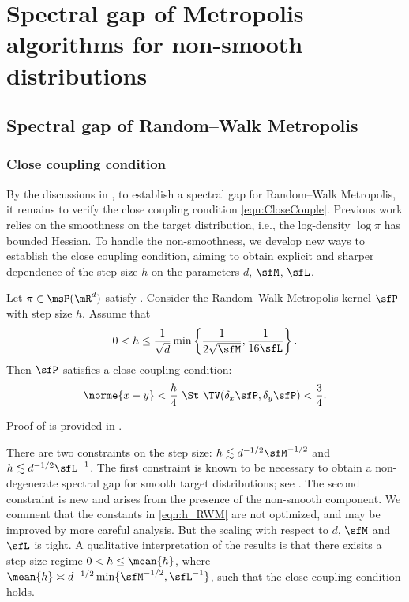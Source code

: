 \documentclass[11pt]{article}
\begin{document}
\section{Spectral gap of Metropolis algorithms for non-smooth distributions}
\label{sec:SpecGapMH}

\subsection{Spectral gap of Random--Walk Metropolis}
\label{sec:SpecGapRWM}

\subsubsection{Close coupling condition}
\label{sec:CloseCoupleRWM}

By the discussions in , to establish a spectral gap for Random--Walk Metropolis, it remains to verify the close coupling condition \eqref{eqn:CloseCouple}.
%
Previous work \citep{24-AAP2058} relies on the smoothness on the target distribution, i.e., the log-density $\log \pi$ has bounded Hessian.
%
To handle the non-smoothness, we develop new ways to establish the close coupling condition, aiming to obtain explicit and sharper dependence of the step size $h$ on the parameters $d$, $\sfM$, $\sfL$.


\begin{lem}
\label{lem:CloseCoupleRWM}
Let $\pi \in \msP(\mR^d)$ satisfy .
Consider the Random--Walk Metropolis kernel $\sfP$ with step size $h$.
Assume that
\begin{equation}
\label{eqn:h_RWM}
    0 < h \le \frac{1}{\sqrt{d}}
    \min\left\{
        \frac{1}{2\sqrt{\sfM}},
        \frac{1}{16\sfL}
    \right\}.
\end{equation}
Then $\sfP$ satisfies a close coupling condition:
\begin{equation}
\label{eqn:CloseCoupleRWM}
    \norme{x-y} < \frac{h}{4} ~\St~ \TV(\delta_x \sfP,\delta_y \sfP) < \frac{3}{4}.
\end{equation}
\end{lem}

Proof of  is provided in .

\begin{rem}
\label{rem:CloseCoupleRWM}
There are two constraints on the step size: \(h \lesssim d^{-1/2} \sfM^{-1/2} \) and \(h \lesssim d^{-1/2}\sfL^{-1}\).
The first constraint is known to be necessary to obtain a non-degenerate spectral gap for smooth target distributions; see \cite{24-AAP2058}.
The second constraint is new and arises from the presence of the non-smooth component.
%
We comment that the constants in \eqref{eqn:h_RWM} are not optimized, and may be improved by more careful analysis. But the scaling with respect to $d$, $\sfM$ and $\sfL$ is tight.
A qualitative interpretation of the results is that there exisits a step size regime $ 0 < h \le \mean{h}$, where $\mean{h} \asymp d^{-1/2} \min\{\sfM^{-1/2}, \sfL^{-1}\}$, such that the close coupling condition holds.

\end{rem}
\end{document}
